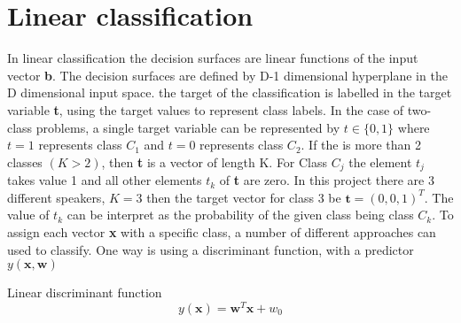 \chapter{Linear classification}
In linear classification the decision surfaces are linear functions of the input vector \textbf{b}. 
The decision surfaces are defined by D-1 dimensional hyperplane in the D dimensional input space.
the target of the classification is labelled in the target variable \textbf{t}, using the target values to represent class labels. 
In the case of two-class problems, a single target variable can be represented by $t\in \lbrace 0,1\rbrace$ where $t = 1$ represents class $C_1$ and $t = 0$ represents class $C_2$.
If the is more than 2 classes $(K>2)$, then \textbf{t} is a vector of length K.
For Class $C_j$ the element $t_j$ takes value 1 and all other elements $t_k$ of \textbf{t} are zero.
In this project there are 3 different speakers, $K = 3$ then the target vector for class 3 be $\textbf{t} = (0, 0, 1)^T$.
The value of $t_k$ can be interpret as the probability of the given class being class $C_k$.
To assign each vector \textbf{x} with a specific class, a number of different approaches can used to classify.
One way is using a discriminant function, with a predictor $y(\textbf{x},\textbf{w})$



Linear discriminant function
\begin{equation}
y(\textbf{x}) = \textbf{w}^T \textbf{x}+w_0
\label{eq:lineDis}
\end{equation}
